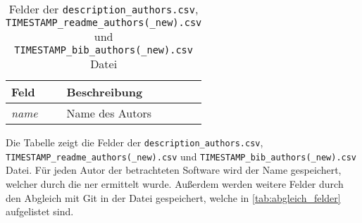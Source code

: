 \begin{table}
    \centering
    \begin{tabularx}{\textwidth}{XL{10.2cm}}
        \toprule
        \textbf{Feld} & \textbf{Beschreibung} \\ \midrule
        \emph{name}   & Name des Autors       \\
        \bottomrule
    \end{tabularx}
    \caption{Felder der \texttt{description\_authors.csv}, \texttt{TIMESTAMP\_readme\_authors(\_new).csv} und \texttt{TIMESTAMP\_bib\_authors(\_new).csv} Datei}
    \label{tab:description_authors}
    \small
    \raggedright
    Die Tabelle zeigt die Felder der \texttt{description\_authors.csv}, \texttt{TIMESTAMP\_readme\_authors(\_new).csv} und \texttt{TIMESTAMP\_bib\_authors(\_new).csv} Datei. Für jeden Autor der betrachteten Software wird der Name gespeichert, welcher durch die \gls{ner} ermittelt wurde. Außerdem werden weitere Felder durch den Abgleich mit Git in der Datei gespeichert, welche in \autoref{tab:abgleich_felder} aufgelistet sind.
\end{table}
